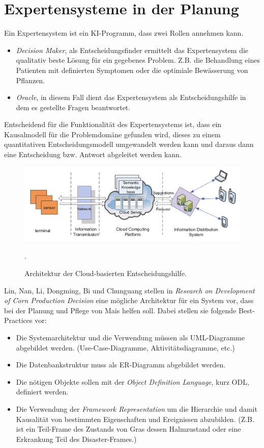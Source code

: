 \section{Expertensysteme in der Planung}
Ein Expertensystem ist ein KI-Programm, dass zwei Rollen annehmen kann.
\begin{itemize}
	\item \textit{Decision Maker}, als Entscheidungsfinder ermittelt das Expertensystem die qualitativ beste Lösung für ein gegebenes Problem. Z.B. die Behandlung eines Patienten mit definierten Symptomen oder die optimiale Bewässerung von Pflanzen.
	\item \textit{Oracle}, in diesem Fall dient das Expertensystem als Entscheidungshilfe in dem es gestellte Fragen beantwortet. 
\end{itemize}
Entscheidend für die Funktionalität des Expertensystems ist, dass ein Kausalmodell für die Problemdomäne gefunden wird, dieses zu einem quantitativen Entscheidungsmodell umgewandelt werden kann und daraus dann eine Entscheidung bzw. Antwort abgeleitet werden kann.\cite{book:Russell1995}

\begin{figure}[h]
 \includegraphics[scale=0.35,natwidth=\textwidth]{figures/designtools/cloud_iot_decisionmaker.png}
 \centering
 \label{fig:fmishierarchy}
 \caption{Architektur der Cloud-basierten Entscheidungshilfe.\cite{jour:Yuan2013}}.
\end{figure}

Lin, Nan, Li, Dongming, Bi und Chunguang stellen in \textit{Research on Development of Corn Production Decision} eine mögliche Architektur für ein System vor, dass bei der Planung und Pflege von Mais helfen soll. Dabei stellen sie folgende Best-Practices vor: 
\cite{jour:Lin2013}

\begin{itemize}
	\item Die Systemarchitektur und die Verwendung müssen als UML-Diagramme abgebildet werden. (Use-Case-Diagramme, Aktivitätsdiagramme, etc.)
	\item Die Datenbankstruktur muss als ER-Diagramm abgebildet werden.
	\item Die nötigen Objekte sollen mit der \textit{Object Definition Language}, kurz ODL, definiert werden.
	\item Die Verwendung der \textit{Framework Representation} um die Hierarchie und damit Kausalität von bestimmten Eigenschaften und Ereignissen abzubilden. (Z.B. ist ein Teil-Frame des Zustands von Gras dessen Halmzustand oder eine Erkrankung Teil des Disaster-Frames.)
\end{itemize}

